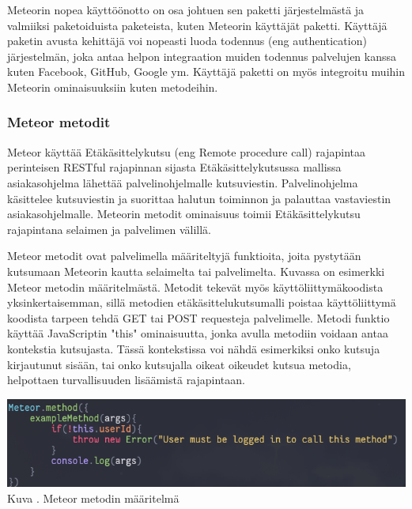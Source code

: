Meteorin nopea käyttöönotto on osa johtuen sen paketti järjestelmästä ja valmiiksi paketoiduista paketeista, kuten Meteorin käyttäjät paketti. 
Käyttäjä paketin avusta kehittäjä voi nopeasti luoda todennus (eng authentication) järjestelmän,
joka antaa helpon integraation muiden todennus palvelujen kanssa kuten Facebook, GitHub, Google ym.
Käyttäjä paketti on myös integroitu muihin Meteorin ominaisuuksiin kuten metodeihin. 



\subsubsection{Meteor metodit}




Meteor käyttää Etäkäsittelykutsu (eng Remote procedure call) rajapintaa perinteisen RESTful rajapinnan sijasta 
Etäkäsittelykutsussa mallissa asiakasohjelma lähettää palvelinohjelmalle kutsuviestin.
Palvelinohjelma käsittelee kutsuviestin ja suorittaa halutun toiminnon ja palauttaa vastaviestin asiakasohjelmalle.
Meteorin metodit ominaisuus toimii Etäkäsittelykutsu rajapintana selaimen ja palvelimen välillä. 
\medskip



Meteor metodit ovat palvelimella määriteltyjä funktioita, joita pystytään kutsumaan Meteorin kautta selaimelta tai palvelimelta. 
Kuvassa \nextImageCount{} on esimerkki Meteor metodin määritelmästä.
Metodit tekevät myös käyttöliittymäkoodista yksinkertaisemman, 
sillä metodien etäkäsittelukutsumalli poistaa käyttöliittymä koodista tarpeen tehdä GET tai POST requesteja palvelimelle.
Metodi funktio käyttää JavaScriptin "this"{} ominaisuutta, jonka
avulla metodiin voidaan antaa kontekstia kutsujasta.
Tässä kontekstissa voi nähdä esimerkiksi onko kutsuja kirjautunut sisään, tai onko kutsujalla oikeat oikeudet kutsua metodia, 
helpottaen turvallisuuden lisäämistä rajapintaan.
\bigskip

\includegraphics[width=15cm]{src/public/methodexample.png}\\
Kuva \getImgCount {}. Meteor metodin määritelmä
\medskip

